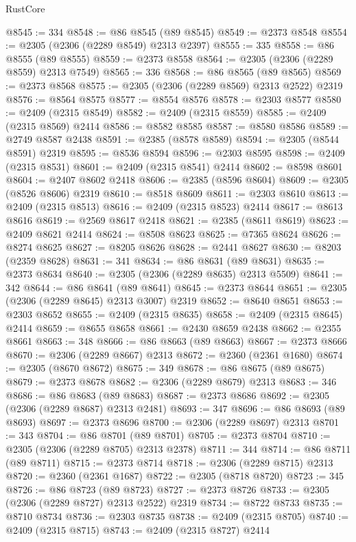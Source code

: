 \begin{lexlean}{RustCore}
\begin{coremodule}
@8545 := 334
@8548 := @86 @8545 (@89 @8545)
@8549 := @2373 @8548
@8554 := @2305 (@2306 (@2289 @8549) @2313 @2397)
@8555 := 335
@8558 := @86 @8555 (@89 @8555)
@8559 := @2373 @8558
@8564 := @2305 (@2306 (@2289 @8559) @2313 @7549)
@8565 := 336
@8568 := @86 @8565 (@89 @8565)
@8569 := @2373 @8568
@8575 := @2305 (@2306 (@2289 @8569) @2313 @2522) @2319
@8576 := @8564 @8575
@8577 := @8554 @8576
@8578 := @2303 @8577
@8580 := @2409 (@2315 @8549)
@8582 := @2409 (@2315 @8559)
@8585 := @2409 (@2315 @8569) @2414
@8586 := @8582 @8585
@8587 := @8580 @8586
@8589 := @2749 @8587 @2438
@8591 := @2385 (@8578 @8589)
@8594 := @2305 (@8544 @8591) @2319
@8595 := @8536 @8594
@8596 := @2303 @8595
@8598 := @2409 (@2315 @8531)
@8601 := @2409 (@2315 @8541) @2414
@8602 := @8598 @8601
@8604 := @2407 @8602 @2418
@8606 := @2385 (@8596 @8604)
@8609 := @2305 (@8526 @8606) @2319
@8610 := @8518 @8609
@8611 := @2303 @8610
@8613 := @2409 (@2315 @8513)
@8616 := @2409 (@2315 @8523) @2414
@8617 := @8613 @8616
@8619 := @2569 @8617 @2418
@8621 := @2385 (@8611 @8619)
@8623 := @2409 @8621 @2414
@8624 := @8508 @8623
@8625 := @7365 @8624
@8626 := @8274 @8625
@8627 := @8205 @8626
@8628 := @2441 @8627
@8630 := @8203 (@2359 @8628)
@8631 := 341
@8634 := @86 @8631 (@89 @8631)
@8635 := @2373 @8634
@8640 := @2305 (@2306 (@2289 @8635) @2313 @5509)
@8641 := 342
@8644 := @86 @8641 (@89 @8641)
@8645 := @2373 @8644
@8651 := @2305 (@2306 (@2289 @8645) @2313 @3007) @2319
@8652 := @8640 @8651
@8653 := @2303 @8652
@8655 := @2409 (@2315 @8635)
@8658 := @2409 (@2315 @8645) @2414
@8659 := @8655 @8658
@8661 := @2430 @8659 @2438
@8662 := @2355 @8661
@8663 := 348
@8666 := @86 @8663 (@89 @8663)
@8667 := @2373 @8666
@8670 := @2306 (@2289 @8667) @2313
@8672 := @2360 (@2361 @1680)
@8674 := @2305 (@8670 @8672)
@8675 := 349
@8678 := @86 @8675 (@89 @8675)
@8679 := @2373 @8678
@8682 := @2306 (@2289 @8679) @2313
@8683 := 346
@8686 := @86 @8683 (@89 @8683)
@8687 := @2373 @8686
@8692 := @2305 (@2306 (@2289 @8687) @2313 @2481)
@8693 := 347
@8696 := @86 @8693 (@89 @8693)
@8697 := @2373 @8696
@8700 := @2306 (@2289 @8697) @2313
@8701 := 343
@8704 := @86 @8701 (@89 @8701)
@8705 := @2373 @8704
@8710 := @2305 (@2306 (@2289 @8705) @2313 @2378)
@8711 := 344
@8714 := @86 @8711 (@89 @8711)
@8715 := @2373 @8714
@8718 := @2306 (@2289 @8715) @2313
@8720 := @2360 (@2361 @1687)
@8722 := @2305 (@8718 @8720)
@8723 := 345
@8726 := @86 @8723 (@89 @8723)
@8727 := @2373 @8726
@8733 := @2305 (@2306 (@2289 @8727) @2313 @2522) @2319
@8734 := @8722 @8733
@8735 := @8710 @8734
@8736 := @2303 @8735
@8738 := @2409 (@2315 @8705)
@8740 := @2409 (@2315 @8715)
@8743 := @2409 (@2315 @8727) @2414

\end{coremodule}
\end{lexlean}
